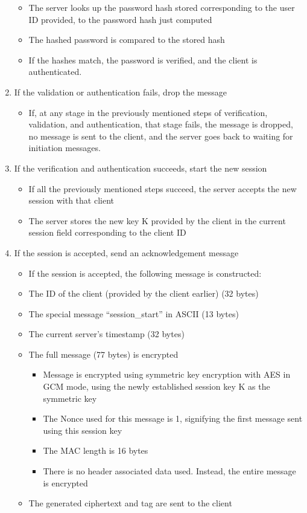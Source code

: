 \documentclass[12pt]{article}
\begin{document}
\begin{enumerate}
\begin{itemize}
        \item The server looks up the password hash stored corresponding to the user ID provided, to the password hash just computed
        \item The hashed password is compared to the stored hash
        \item If the hashes match, the password is verified, and the client is authenticated. 
    \end{itemize}
    \item If the validation or authentication fails, drop the message
    \begin{itemize}
        \item If, at any stage in the previously mentioned steps of verification, validation, and authentication, that stage fails, the message is dropped, no message is sent to the client, and the server goes back to waiting for initiation messages.
    \end{itemize}
    
    \item If the verification and authentication succeeds, start the new session
    \begin{itemize}
        \item If all the previously mentioned steps succeed, the server accepts the new session with that client
        \item The server stores the new key K provided by the client in the current session field corresponding to the client ID
    \end{itemize}
    \item If the session is accepted, send an acknowledgement message	
    \begin{itemize}
        \item If the session is accepted, the following message is constructed:
        \item The ID of the client (provided by the client earlier) (32 bytes)
        \item The special message “session\_start” in ASCII (13 bytes)
        \item The current server’s timestamp (32 bytes)
        \item The full message (77 bytes) is encrypted
        \begin{itemize}
            \item Message is encrypted using symmetric key encryption with AES in GCM mode, using the newly established session key K as the symmetric key
            \item The Nonce used for this message is 1, signifying the first message sent using this session key
            \item The MAC length is 16 bytes
            \item There is no header associated data used. Instead, the entire message is encrypted
        \end{itemize}
        \item The generated ciphertext and tag are sent to the client
    \end{itemize}

\end{enumerate}
\end{document}
